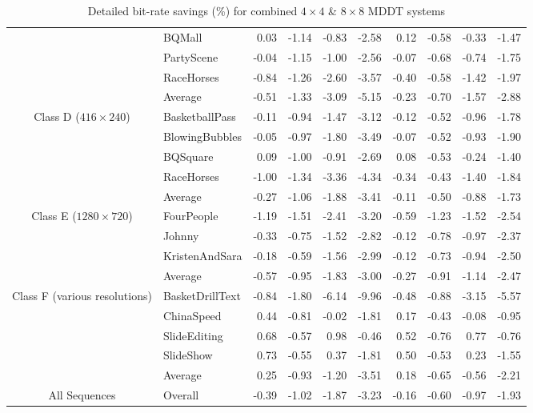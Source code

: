 \documentclass[11pt,a4paper,openright,twoside]{book}
\numberwithin{equation}{section} %
\numberwithin{figure}{section} %
\numberwithin{table}{section} %
\begin{document}
\begin{table}[tb]
\begin{tabularx}{\textwidth}{c|X|rr|rr|rr|rr}
		& BQMall               &  0.03 & -1.14 & -0.83 &  -2.58 &  0.12 & -0.58 & -0.33 & -1.47 \\
		& PartyScene           & -0.04 & -1.15 & -1.00 &  -2.56 & -0.07 & -0.68 & -0.74 & -1.75 \\
		& RaceHorses           & -0.84 & -1.26 & -2.60 &  -3.57 & -0.40 & -0.58 & -1.42 & -1.97 \\
		\cline{2-10}
		& Average              & -0.51 & -1.33 & -3.09 &  -5.15 & -0.23 & -0.70 & -1.57 & -2.88 \\
		\hline\hline
		\multirow{5}{0.10\textwidth}{\centering Class D \scriptsize($416\times240$)}
		& BasketballPass       & -0.11 & -0.94 & -1.47 &  -3.12 & -0.12 & -0.52 & -0.96 & -1.78 \\
		& BlowingBubbles       & -0.05 & -0.97 & -1.80 &  -3.49 & -0.07 & -0.52 & -0.93 & -1.90 \\
		& BQSquare             &  0.09 & -1.00 & -0.91 &  -2.69 &  0.08 & -0.53 & -0.24 & -1.40 \\
		& RaceHorses           & -1.00 & -1.34 & -3.36 &  -4.34 & -0.34 & -0.43 & -1.40 & -1.84 \\
		\cline{2-10}
		& Average              & -0.27 & -1.06 & -1.88 &  -3.41 & -0.11 & -0.50 & -0.88 & -1.73 \\
		\hline\hline
		\multirow{4}{0.10\textwidth}{\centering Class E \scriptsize($1280\times720$)}
		& FourPeople           & -1.19 & -1.51 & -2.41 &  -3.20 & -0.59 & -1.23 & -1.52 & -2.54 \\
		& Johnny               & -0.33 & -0.75 & -1.52 &  -2.82 & -0.12 & -0.78 & -0.97 & -2.37 \\
		& KristenAndSara       & -0.18 & -0.59 & -1.56 &  -2.99 & -0.12 & -0.73 & -0.94 & -2.50 \\
		\cline{2-10}
		& Average              & -0.57 & -0.95 & -1.83 & -3.00 & -0.27 & -0.91 & -1.14 & -2.47 \\
		\hline\hline
		\multirow{5}{0.10\textwidth}{\centering Class F \scriptsize(various resolutions)}
		& BasketDrillText      & -0.84 & -1.80 & -6.14 &  -9.96 & -0.48 & -0.88 & -3.15 & -5.57 \\
		& ChinaSpeed           &  0.44 & -0.81 & -0.02 &  -1.81 &  0.17 & -0.43 & -0.08 & -0.95 \\
		& SlideEditing         &  0.68 & -0.57 &  0.98 &  -0.46 &  0.52 & -0.76 &  0.77 & -0.76 \\
		& SlideShow            &  0.73 & -0.55 &  0.37 &  -1.81 &  0.50 & -0.53 &  0.23 & -1.55 \\
		\cline{2-10}
		& Average              &  0.25 & -0.93 & -1.20 &  -3.51 & 0.18  & -0.65 & -0.56 & -2.21 \\
		\hline\hline
		All Sequences
		& Overall          & -0.39 & -1.02 & -1.87 &  -3.23 & -0.16 & -0.60 & -0.97 & -1.93 \\
	\end{tabularx}
	\caption{Detailed bit-rate savings (\%) for combined $4\times4$ \& $8\times8$
	\acs{MDDT} systems}
	\label{tab:detailed_mddt_bd_rate}
\end{table}
\end{document}
